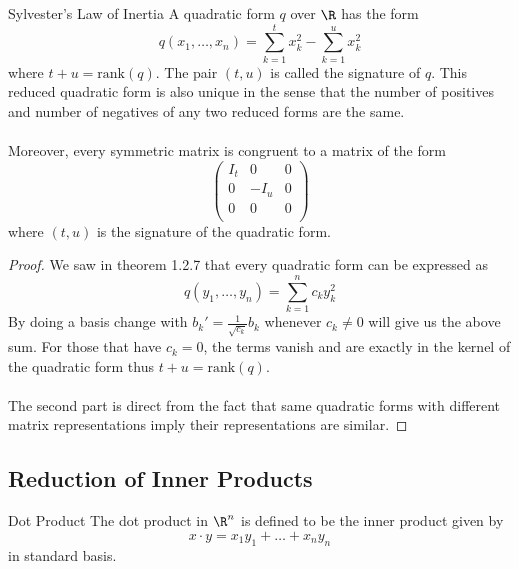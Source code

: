 \begin{prp}{Sylvester's Law of Inertia}{} A quadratic form $q$ over $\R$ has the form $$q(x_1,\dots,x_n)=\sum_{k=1}^tx_k^2-\sum_{k=1}^ux_k^2$$ where $t+u=\text{rank}(q)$. The pair $(t,u)$ is called the signature of $q$. This reduced quadratic form is also unique in the sense that the number of positives and number of negatives of any two reduced forms are the same. \\~\\ Moreover, every symmetric matrix is congruent to a matrix of the form $$\begin{pmatrix}
I_t & 0 & 0\\
0 & -I_u & 0\\
0 & 0 & 0\\
\end{pmatrix}$$ where $(t,u)$ is the signature of the quadratic form. \tcbline
\begin{proof}
We saw in theorem 1.2.7 that every quadratic form can be expressed as $$q(y_1,\dots,y_n)=\sum_{k=1}^nc_ky_k^2$$ By doing a basis change with $b_k'=\frac{1}{\sqrt{c_k}}b_k$ whenever $c_k\neq 0$ will give us the above sum. For those that have $c_k=0$, the terms vanish and are exactly in the kernel of the quadratic form thus $t+u=\text{rank}(q)$. \\~\\
The second part is direct from the fact that same quadratic forms with different matrix representations imply their representations are similar. 
\end{proof}
\end{prp}

\subsection{Reduction of Inner Products}
\begin{defn}{Dot Product}{} The dot product in $\R^n$ is defined to be the inner product given by $$x\cdot y=x_1y_1+\dots+x_ny_n$$ in standard basis. 
\end{defn}

